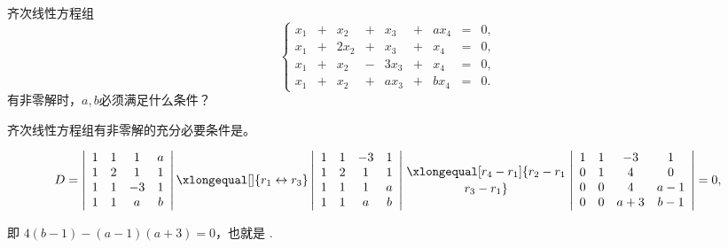 \begin{frame}
\begin{testexample}
  齐次线性方程组
  $$
  \left\{
    \begin{array}{rcrcrcrcrc}
      x_1&+& x_2&+& x_3&+&ax_4&=&0,\\[0.1cm]
      x_1&+&2x_2&+& x_3&+& x_4&=&0,\\[0.1cm]
      x_1&+& x_2&-&3x_3&+& x_4&=&0,\\[0.1cm]
      x_1&+& x_2&+&ax_3&+&bx_4&=&0.
    \end{array}
  \right.
  $$
  有非零解时，$a,b$必须满足什么条件？
\end{testexample} \pause 

\begin{zhu}
  齐次线性方程组有非零解的充分必要条件是。
\end{zhu}\pause

\begin{jie}
$$
D = \left|
  \begin{array}{cccc}
    1&1&1&a\\
    1&2&1&1\\
    1&1&-3&1\\
    1&1&a&b\\
  \end{array}
\right|  \xlongequal[]{r_1\leftrightarrow r_3}
\left|
  \begin{array}{cccc}
    1&1&-3&1\\
    1&2&1&1\\
    1&1&1&a\\
    1&1&a&b\\
  \end{array}
\right|  \xlongequal[r_4-r_1]{r_2-r_1 \atop r_3-r_1}
\left|
  \begin{array}{cccc}
    1&1&-3&1\\
    0&1&4&0\\
    0&0&4&a-1\\
    0&0&a+3&b-1\\
  \end{array}
\right| = 0,
$$

即
$4(b-1)-(a-1)(a+3)=0$，也就是
.
\end{jie}

\end{frame}

